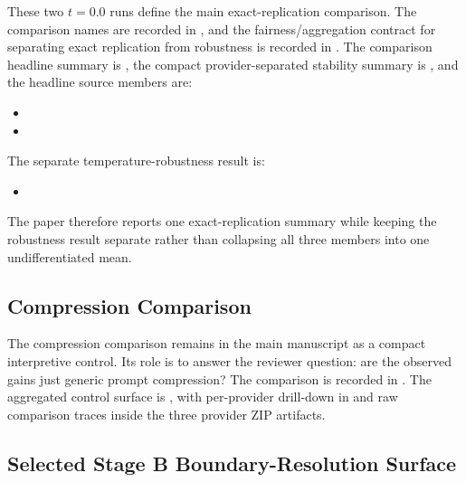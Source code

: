 \documentclass[11pt,a4paper]{article}
\begin{document}
These two \(t=0.0\) runs define the main exact-replication comparison. The
comparison names are recorded in
, and
the fairness/aggregation contract for separating exact replication from
robustness is recorded in
. The
comparison headline summary is
,
the compact provider-separated stability summary is
,
and the headline source members are:
\begin{itemize}
  \item {}
  \item {}
\end{itemize}
The separate temperature-robustness result is:
\begin{itemize}
  \item {}
\end{itemize}
The paper therefore reports one exact-replication summary while keeping the
robustness result separate rather than collapsing all three members into one
undifferentiated mean.

\subsection{Compression Comparison}

The compression comparison remains in the main manuscript as a compact
interpretive control. Its role is to answer the reviewer question: are the
observed gains just generic prompt compression? The comparison is recorded in
. The
aggregated control surface is
,
with per-provider drill-down in
and raw comparison traces inside the three provider ZIP artifacts.

\subsection{Selected Stage B Boundary-Resolution Surface}
\end{document}
